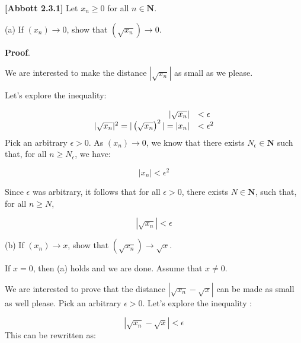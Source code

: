 \documentclass[10pt]{article}
\begin{document}
\textbf{[Abbott 2.3.1]} Let $\displaystyle x_{n} \geq 0$ for all $\displaystyle n\in \mathbf{N}$. 



(a) If $\displaystyle ( x_{n})\rightarrow 0$, show that $\displaystyle \left(\sqrt{x_{n}}\right)\rightarrow 0$.



\textbf{Proof}.

We are interested to make the distance $\displaystyle |\sqrt{x_{n}} |$ as small as we please. 



Let's explore the inequality:


\begin{equation*}
\begin{array}{ r l }
|\sqrt{x_{n}} | & < \epsilon \\
|\sqrt{x_{n}} |^{2} =|\left(\sqrt{x_{n}}\right)^{2} |=|x_{n} | & < \epsilon ^{2}
\end{array}
\end{equation*}
Pick an arbitrary $\displaystyle \epsilon  >0$. As $\displaystyle ( x_{n})\rightarrow 0$, we know that there exists $\displaystyle N_{\epsilon } \in \mathbf{N}$ such that, for all $\displaystyle n\geq N_{\epsilon }$, we have:


\begin{equation*}
|x_{n} |< \epsilon ^{2}
\end{equation*}


Since $\displaystyle \epsilon $ was arbitrary, it follows that for all $\displaystyle \epsilon  >0$, there exists $\displaystyle N\in \mathbf{N}$, such that, for all $\displaystyle n\geq N$,


\begin{equation*}
|\sqrt{x_{n}} |< \epsilon 
\end{equation*}




(b) If $\displaystyle ( x_{n})\rightarrow x$, show that $\displaystyle \left(\sqrt{x_{n}}\right)\rightarrow \sqrt{x}$.



If $\displaystyle x=0$, then (a) holds and we are done. Assume that $\displaystyle x\neq 0$.



We are interested to prove that the distance $\displaystyle |\sqrt{x_{n}} -\sqrt{x} |$ can be made as small as well please. Pick an arbitrary $\displaystyle \epsilon  >0$. Let's explore the inequality :


\begin{equation*}
|\sqrt{x_{n}} -\sqrt{x} |< \epsilon 
\end{equation*}
This can be rewritten as:
\end{document}
